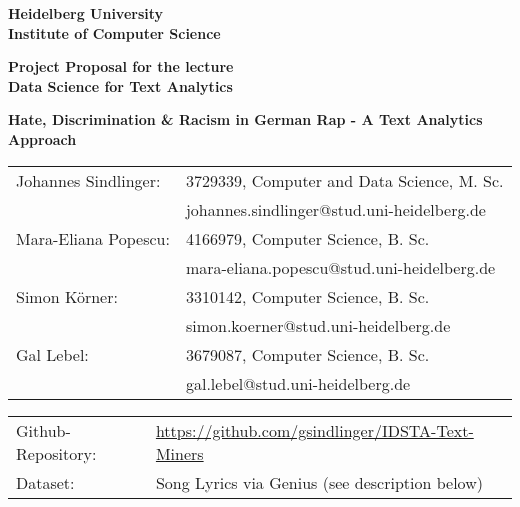 \documentclass[
     12pt,         %
     a4paper,      %
     BCOR10mm,     %
     DIV14,        %
     ]{article}
\begin{document}
\begin{titlepage}


\begin{center}
\vspace*{2cm}
\textbf{ 
\Large Heidelberg University\\
\smallskip
\Large Institute of Computer Science\\
\smallskip
}

\vspace{3cm}

\textbf{\large Project Proposal for the lecture \\  Data Science for Text Analytics}

\vspace{0.5\baselineskip}
{\huge
\textbf{Hate, Discrimination \& Racism in German Rap - A Text Analytics Approach}
}
\end{center}

\vfill 

{\large
\begin{tabular}[l]{ll}
Johannes Sindlinger: & 3729339, Computer and Data Science, M. Sc.\\
  & johannes.sindlinger@stud.uni-heidelberg.de\\
Mara-Eliana Popescu: & 4166979, Computer Science, B. Sc. \\
  & mara-eliana.popescu@stud.uni-heidelberg.de\\
Simon K{\"o}rner: & 3310142, Computer Science, B. Sc.\\
  & simon.koerner@stud.uni-heidelberg.de\\
Gal Lebel: & 3679087, Computer Science, B. Sc. \\
  & gal.lebel@stud.uni-heidelberg.de\\
  
\end{tabular}
}

\vspace{1cm}
\begin{tabular}[l]{ll}
Github-Repository: & \url{https://github.com/gsindlinger/IDSTA-Text-Miners} \\
Dataset: & Song Lyrics via Genius \cite{genius} (see description below) \\
\end{tabular}
\end{titlepage}










\end{document}
